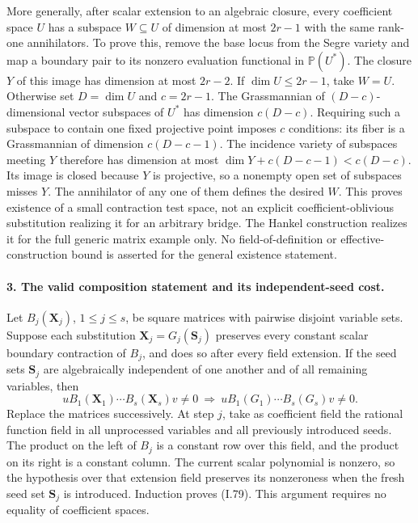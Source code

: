 More generally, after scalar extension to an algebraic closure,
every coefficient space $U$ has a subspace $W\subseteq U$ of
dimension at most $2r-1$ with the same rank-one annihilators.
To prove this, remove the base locus from the Segre
variety and map a boundary pair to its nonzero evaluation functional
in $\mathbb P(U^*)$. The closure $Y$ of this image has dimension at
most $2r-2$. If $\dim U\le2r-1$, take $W=U$. Otherwise set
$D=\dim U$ and $c=2r-1$. The Grassmannian of $(D-c)$-dimensional
vector subspaces of $U^*$ has dimension $c(D-c)$. Requiring such
a subspace to contain one fixed projective point imposes $c$
conditions: its fiber is a Grassmannian of dimension
$c(D-c-1)$. The incidence variety of subspaces meeting $Y$
therefore has dimension at most
$\dim Y+c(D-c-1)<c(D-c)$. Its image is closed because $Y$ is
projective, so a nonempty open set of subspaces misses $Y$.
The annihilator of any one of them defines the desired $W$.
This proves existence of a small contraction test space, not
an explicit coefficient-oblivious substitution realizing it for
an arbitrary bridge. The Hankel construction realizes it for the
full generic matrix example only. No field-of-definition or
effective-construction bound is asserted for the general existence
statement.

\paragraph{3. The valid composition statement and its independent-seed cost.}
Let $B_j(\mathbf X_j)$, $1\le j\le s$, be square matrices with
pairwise disjoint variable sets. Suppose each substitution
$\mathbf X_j=G_j(\mathbf S_j)$ preserves every constant scalar
boundary contraction of $B_j$, and does so after every field extension.
If the seed sets $\mathbf S_j$ are algebraically independent of one
another and of all remaining variables, then
\[
 uB_1(\mathbf X_1)\cdots B_s(\mathbf X_s)v\ne0
 \ \Longrightarrow\
 uB_1(G_1)\cdots B_s(G_s)v\ne0.
 \tag{I.79}
\]
Replace the matrices successively. At step $j$, take as coefficient
field the rational function field in all unprocessed variables and
all previously introduced seeds. The product on the left of $B_j$
is a constant row over this field, and the product on its right is
a constant column. The current scalar polynomial is nonzero, so
the hypothesis over that extension field preserves its nonzeroness
when the fresh seed set $\mathbf S_j$ is introduced. Induction proves
(I.79). This argument requires no equality of coefficient spaces.

